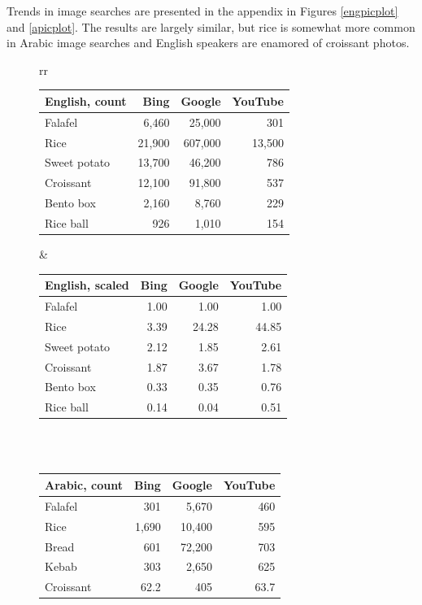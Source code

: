 \documentclass[a4paper,10pt]{article}
\begin{document}
Trends in image searches are presented in the appendix in Figures \ref{engpicplot} and \ref{apicplot}.
The results are largely similar, but rice is somewhat more common in Arabic image searches
and English speakers are enamored of croissant photos.
\enlargethispage{\baselineskip}
\enlargethispage{\baselineskip}


\begin{figure}
\hspace{-2cm}
\begin{tabular}{rr}

\begin{tabular}{l|rrr}
{\bf English, count} & Bing & Google & YouTube \\\hline
Falafel  & 6,460 & 25,000 & 301\\
Rice    & 21,900 & 607,000 & 13,500\\
Sweet potato & 13,700 & 46,200 & 786\\
Croissant & 12,100 & 91,800 & 537 \\
Bento box & 2,160 & 8,760 & 229 \\
Rice ball & 926 & 1,010 & 154\\
\end{tabular}

&

\begin{tabular}{l|rrr}
{\bf English, scaled} & Bing & Google & YouTube \\\hline

Falafel  &1.00& 1.00 & 1.00 \\
Rice    &3.39&24.28 & 44.85 \\
Sweet potato &2.12& 1.85 & 2.61 \\
Croissant &1.87& 3.67 & 1.78 \\
Bento box &0.33& 0.35 & 0.76 \\
Rice ball &0.14& 0.04 & 0.51
\end{tabular}
\\
\phantom{Filler}\\

\begin{tabular}{l|rrr}
{\bf Arabic, count} & Bing & Google & YouTube \\\hline
Falafel & 301  & 5,670 & 460\\
Rice & 1,690& 10,400 & 595\\
Bread  & 601& 72,200   & 703\\
Kebab & 303 & 2,650   & 625\\
Croissant & 62.2 & 405 & 63.7
\end{tabular}


\end{tabular}
\end{figure}
\end{document}
